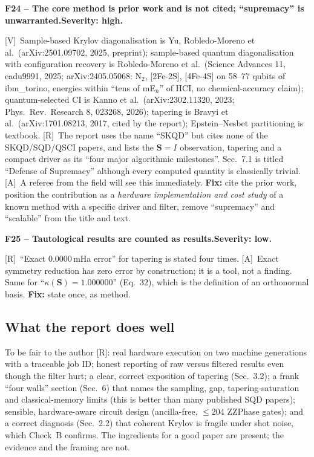 \documentclass[11pt,a4paper]{article}
\newcommand{\lR}{\textcolor{keyblue}{[R]}}   %
\newcommand{\lV}{\textcolor{keyblue}{[V]}}   %
\newcommand{\lA}{\textcolor{notegray}{[A]}}  %
\newcommand{\sev}[1]{\textbf{Severity: #1.}}
\newcommand{\flaw}[4]{\par\medskip\noindent\textbf{#1 -- #2.}\quad{\small\textcolor{notegray}{Where: #3.}}\quad\sev{#4}\par\nobreak}
\begin{document}
\flaw{F24}{The core method is prior work and is not cited; ``supremacy'' is unwarranted}{p.~8, Sec.~3.4; p.~13, Sec.~7.1; references}{high}
\lV\ Sample-based Krylov diagonalisation is Yu, Robledo-Moreno et al.\ (arXiv:2501.09702, 2025, preprint); sample-based quantum diagonalisation with configuration recovery is Robledo-Moreno et al.\ (Science Advances 11, eadu9991, 2025; arXiv:2405.05068: N$_2$, [2Fe-2S], [4Fe-4S] on 58--77 qubits of ibm\_torino, energies within ``tens of mE$_h$'' of HCI, no chemical-accuracy claim); quantum-selected CI is Kanno et al.\ (arXiv:2302.11320, 2023; Phys.\ Rev.\ Research 8, 023268, 2026); tapering is Bravyi et al.\ (arXiv:1701.08213, 2017, cited by the report); Epstein--Nesbet partitioning is textbook. \lR\ The report uses the name ``SKQD'' but cites none of the SKQD/SQD/QSCI papers, and lists the $\mathbf S=I$ observation, tapering and a compact driver as its ``four major algorithmic milestones''. Sec.~7.1 is titled ``Defense of Supremacy'' although every computed quantity is classically trivial. \lA\ A referee from the field will see this immediately. \textbf{Fix:} cite the prior work, position the contribution as a \emph{hardware implementation and cost study} of a known method with a specific driver and filter, remove ``supremacy'' and ``scalable'' from the title and text.

\flaw{F25}{Tautological results are counted as results}{abstract; p.~6; p.~13}{low}
\lR\ ``Exact 0.0000\,mHa error'' for tapering is stated four times. \lA\ Exact symmetry reduction has zero error by construction; it is a tool, not a finding. Same for ``$\kappa(\mathbf S)=1.000000$'' (Eq.~32), which is the definition of an orthonormal basis. \textbf{Fix:} state once, as method.

\subsection{What the report does well}
To be fair to the author \lR: real hardware execution on two machine generations with a traceable job ID; honest reporting of raw versus filtered results even though the filter hurt; a clear, correct exposition of tapering (Sec.~3.2); a frank ``four walls'' section (Sec.~6) that names the sampling, gap, tapering-saturation and classical-memory limits (this is better than many published SQD papers); sensible, hardware-aware circuit design (ancilla-free, $\le204$ ZZPhase gates); and a correct diagnosis (Sec.~2.2) that coherent Krylov is fragile under shot noise, which Check~B confirms. The ingredients for a good paper are present; the evidence and the framing are not.
\end{document}

